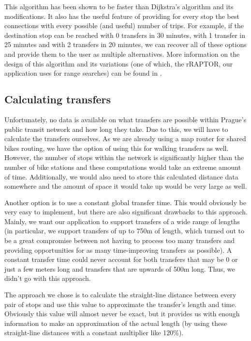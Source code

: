This algorithm has been shown to be faster than Dijkstra's algorithm and its modifications\cite{delling2015raptor}. It also has the useful feature of providing for every stop the best connections with every possible (and useful) number of trips. For example, if the destination stop can be reached with 0 transfers in 30 minutes, with 1 transfer in 25 minutes and with 2 transfers in 20 minutes, we can recover all of these options and provide them to the user as multiple alternatives. More information on the design of this algorithm and its variations (one of which, the rRAPTOR, our application uses for range searches) can be found in \textcite{delling2015raptor}.

\subsection{Calculating transfers}
\label{subsec:calculating_transfers}

Unfortunately, no data is available on what transfers are possible within Prague's public transit network and how long they take. Due to this, we will have to calculate the transfers ourselves. As we are already using a map router for shared bikes routing, we have the option of using this for walking transfers as well. However, the number of stops within the network is significantly higher than the number of bike stations and these computations would take an extreme amount of time. Additionally, we would also need to store this calculated distance data somewhere and the amount of space it would take up would be very large as well.

Another option is to use a constant global transfer time. This would obviously be very easy to implement, but there are also significant drawbacks to this approach. Mainly, we want our application to support transfers of a wide range of lengths (in particular, we support transfers of up to 750m of length, which turned out to be a great compromise between not having to process too many transfers and providing opportunities for as many time-improving transfers as possible). A constant transfer time could never account for both transfers that may be 0 or just a few meters long and transfers that are upwards of 500m long. Thus, we didn't go with this approach.

The approach we chose is to calculate the straight-line distance between every pair of stops and use this value to approximate the transfer's length and time. Obviously this value will almost never be exact, but it provides us with enough information to make an approximation of the actual length (by using these straight-line distances with a constant multiplier like 120\%).

